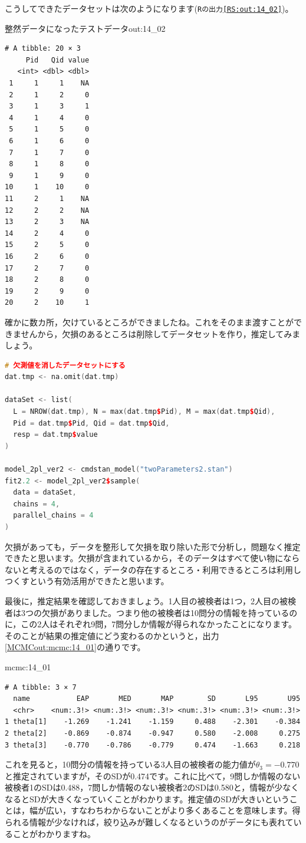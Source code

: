 \documentclass{ltjsbook}
\begin{document}
こうしてできたデータセットは次のようになります(\texttt{Rの出力\ref{RS:out:14_02}})。
\begin{Rscreen}{整然データになったテストデータ}{out:14_02}
	\begin{verbatim}
# A tibble: 20 × 3
     Pid   Qid value
   <int> <dbl> <dbl>
 1     1     1    NA
 2     1     2     0
 3     1     3     1
 4     1     4     0
 5     1     5     0
 6     1     6     0
 7     1     7     0
 8     1     8     0
 9     1     9     0
10     1    10     0
11     2     1    NA
12     2     2    NA
13     2     3    NA
14     2     4     0
15     2     5     0
16     2     6     0
17     2     7     0
18     2     8     0
19     2     9     0
20     2    10     1
    \end{verbatim}
\end{Rscreen}
確かに数カ所，欠けているところができましたね。これをそのまま渡すことができませんから，欠損のあるところは削除してデータセットを作り，推定してみましょう。
\begin{lstlisting}[language=c++,label={code:14_07},caption={データセットを作って推定する}]
# 欠測値を消したデータセットにする
dat.tmp <- na.omit(dat.tmp)

dataSet <- list(
  L = NROW(dat.tmp), N = max(dat.tmp$Pid), M = max(dat.tmp$Qid),
  Pid = dat.tmp$Pid, Qid = dat.tmp$Qid,
  resp = dat.tmp$value
)

model_2pl_ver2 <- cmdstan_model("twoParameters2.stan")
fit2.2 <- model_2pl_ver2$sample(
  data = dataSet,
  chains = 4,
  parallel_chains = 4
)
\end{lstlisting}
欠損があっても，データを整形して欠損を取り除いた形で分析し，問題なく推定できたと思います。欠損が含まれているから，そのデータはすべて使い物にならないと考えるのではなく，データの存在するところ・利用できるところは利用しつくすという有効活用ができたと思います。

最後に，推定結果を確認しておきましょう。1人目の被検者は1つ，2人目の被検者は3つの欠損がありました。つまり他の被検者は10問分の情報を持っているのに，この2人はそれぞれ9問，7問分しか情報が得られなかったことになります。
そのことが結果の推定値にどう変わるのかというと，出力\ref{MCMCout:mcmc:14_01}の通りです。
\begin{MCMCout}{}{mcmc:14_01}
	\begin{verbatim}
# A tibble: 3 × 7
  name           EAP       MED       MAP        SD       L95       U95
  <chr>    <num:.3!> <num:.3!> <num:.3!> <num:.3!> <num:.3!> <num:.3!>
1 theta[1]    -1.269    -1.241    -1.159     0.488    -2.301    -0.384
2 theta[2]    -0.869    -0.874    -0.947     0.580    -2.008     0.275
3 theta[3]    -0.770    -0.786    -0.779     0.474    -1.663     0.218
\end{verbatim}
\end{MCMCout}
これを見ると，10問分の情報を持っている3人目の被検者の能力値が$\theta_3 = -0.770$と推定されていますが，そのSDが0.474です。これに比べて，9問しか情報のない被検者1のSDは0.488，7問しか情報のない被検者2のSDは0.580と，情報が少なくなるとSDが大きくなっていくことがわかります。推定値のSDが大きいということは，幅が広い，すなわちわからないことがより多くあることを意味します。得られる情報が少なければ，絞り込みが難しくなるというのがデータにも表れていることがわかりますね。
\end{document}
